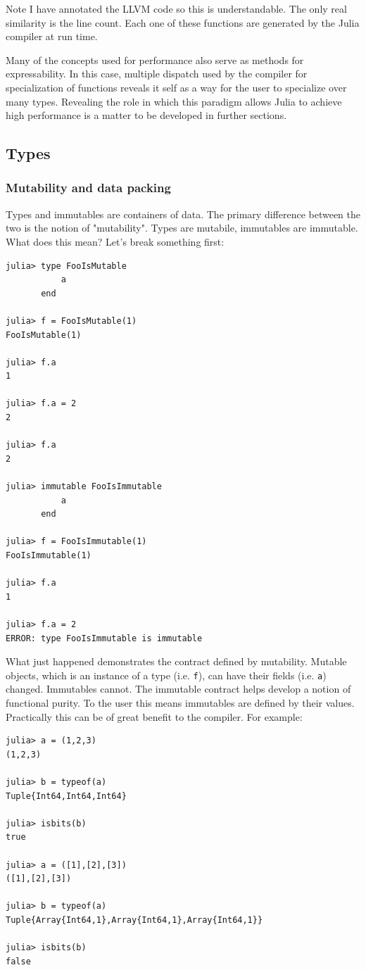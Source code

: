 \documentclass[a4paper]{article}
\begin{document}
Note I have annotated the LLVM code so this is understandable. 
The only real similarity is the line count. Each one of these functions are generated by the
Julia compiler at run time.

Many of the concepts used for performance also serve as methods for
expressability. In this case, multiple dispatch used by the compiler for
specialization of functions reveals it self as a way for the user to
specialize over many types.
Revealing the role in which this paradigm allows Julia to achieve high
performance is a matter to be developed in further sections.

\subsection{Types}

\subsubsection{Mutability and data packing}
Types and immutables are containers of data. The primary difference between
the two is the notion of "mutability". Types are mutabile, immutables are 
immutable. What does this mean? Let's break something first:
\begin{lstlisting}
julia> type FooIsMutable
           a
       end

julia> f = FooIsMutable(1)
FooIsMutable(1)

julia> f.a
1

julia> f.a = 2
2

julia> f.a
2

julia> immutable FooIsImmutable
           a
       end

julia> f = FooIsImmutable(1)
FooIsImmutable(1)

julia> f.a
1

julia> f.a = 2
ERROR: type FooIsImmutable is immutable
\end{lstlisting}

What just happened demonstrates the contract defined by mutability. Mutable
objects, which is an instance of a type (i.e. \texttt{f}), can have their fields
(i.e. \texttt{a}) changed. Immutables cannot. The immutable contract helps develop
a notion of functional purity. To the user this means immutables are defined
by their values. Practically this can be of great benefit to
the compiler. For example:
\begin{lstlisting}
julia> a = (1,2,3)
(1,2,3)

julia> b = typeof(a)
Tuple{Int64,Int64,Int64}

julia> isbits(b)
true

julia> a = ([1],[2],[3])
([1],[2],[3])

julia> b = typeof(a)
Tuple{Array{Int64,1},Array{Int64,1},Array{Int64,1}}

julia> isbits(b)
false
\end{lstlisting}
\end{document}
